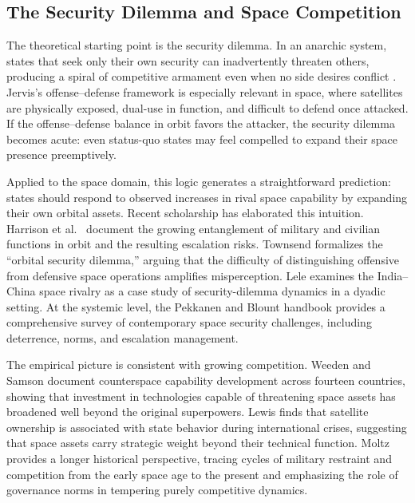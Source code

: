 \documentclass[11pt]{article}
\begin{document}
\subsection{The Security Dilemma and Space Competition}

The theoretical starting point is the security dilemma. In an anarchic system, states that seek only their own security can inadvertently threaten others, producing a spiral of competitive armament even when no side desires conflict \cite{jervis1978}. Jervis's offense--defense framework is especially relevant in space, where satellites are physically exposed, dual-use in function, and difficult to defend once attacked. If the offense--defense balance in orbit favors the attacker, the security dilemma becomes acute: even status-quo states may feel compelled to expand their space presence preemptively.

Applied to the space domain, this logic generates a straightforward prediction: states should respond to observed increases in rival space capability by expanding their own orbital assets. Recent scholarship has elaborated this intuition. Harrison et al.\ \cite{harrison2017} document the growing entanglement of military and civilian functions in orbit and the resulting escalation risks. Townsend \cite{townsend2020} formalizes the ``orbital security dilemma,'' arguing that the difficulty of distinguishing offensive from defensive space operations amplifies misperception. Lele \cite{lele2019} examines the India--China space rivalry as a case study of security-dilemma dynamics in a dyadic setting. At the systemic level, the Pekkanen and Blount \cite{pekkanen2024} handbook provides a comprehensive survey of contemporary space security challenges, including deterrence, norms, and escalation management.

The empirical picture is consistent with growing competition. Weeden and Samson \cite{weeden2024} document counterspace capability development across fourteen countries, showing that investment in technologies capable of threatening space assets has broadened well beyond the original superpowers. Lewis \cite{lewis2019} finds that satellite ownership is associated with state behavior during international crises, suggesting that space assets carry strategic weight beyond their technical function. Moltz \cite{moltz2019} provides a longer historical perspective, tracing cycles of military restraint and competition from the early space age to the present and emphasizing the role of governance norms in tempering purely competitive dynamics.
\end{document}
